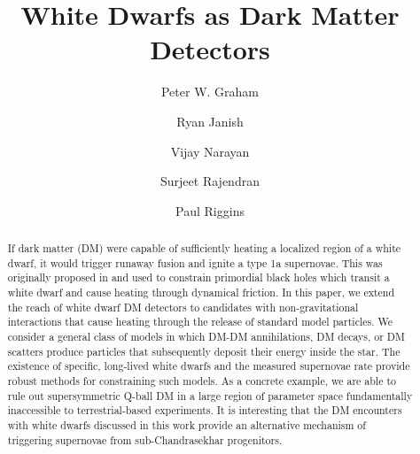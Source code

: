 \documentclass[twocolumn,preprintnumbers,amsmath,amssymb,prd, superscriptaddress]{revtex4} %
\begin{document}


\title{White Dwarfs as Dark Matter Detectors}

\author{Peter W. Graham}

\author{Ryan Janish}

\author{Vijay Narayan}

\author{Surjeet Rajendran}

\author{Paul Riggins}

\begin{abstract}

If dark matter (DM) were capable of sufficiently heating a localized region of a white dwarf, it would trigger runaway fusion and ignite a type 1a supernovae.
This was originally proposed in \cite{Graham:2015apa} and used to constrain primordial black holes which transit a white dwarf and cause heating through dynamical friction.
In this paper, we extend the reach of white dwarf DM detectors to candidates with non-gravitational interactions that cause heating through the release of standard model particles.
We consider a general class of models in which DM-DM annihilations, DM decays, or DM scatters produce particles that subsequently deposit their energy inside the star.
The existence of specific, long-lived white dwarfs and the measured supernovae rate provide robust methods for constraining such models.
As a concrete example, we are able to rule out supersymmetric Q-ball DM in a large region of parameter space fundamentally inaccessible to terrestrial-based experiments.
It is interesting that the DM encounters with white dwarfs discussed in this work provide an alternative mechanism of triggering supernovae from sub-Chandrasekhar progenitors.

\end{abstract}
\maketitle
\tableofcontents
\clearpage
\end{document}
